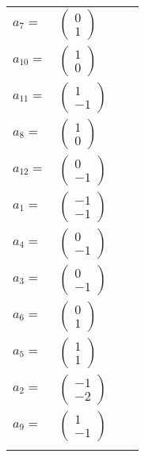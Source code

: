 \documentclass[1p]{elsarticle_modified}
\theoremstyle{definition}
\begin{document}
\begin{tabular}{m{7pt} m{180pt} m{7pt} m{180pt} }
\flushright $a_{7}=$&$\begin{pmatrix}0\\1\end{pmatrix}$ \\
\flushright $a_{10}=$&$\begin{pmatrix}1\\0\end{pmatrix}$ \\
\flushright $a_{11}=$&$\begin{pmatrix}1\\-1\end{pmatrix}$ \\
\flushright $a_{8}=$&$\begin{pmatrix}1\\0\end{pmatrix}$ \\
\flushright $a_{12}=$&$\begin{pmatrix}0\\-1\end{pmatrix}$ \\
\flushright $a_{1}=$&$\begin{pmatrix}-1\\-1\end{pmatrix}$ \\
\flushright $a_{4}=$&$\begin{pmatrix}0\\-1\end{pmatrix}$ \\
\flushright $a_{3}=$&$\begin{pmatrix}0\\-1\end{pmatrix}$ \\
\flushright $a_{6}=$&$\begin{pmatrix}0\\1\end{pmatrix}$ \\
\flushright $a_{5}=$&$\begin{pmatrix}1\\1\end{pmatrix}$ \\
\flushright $a_{2}=$&$\begin{pmatrix}-1\\-2\end{pmatrix}$ \\
\flushright $a_{9}=$&$\begin{pmatrix}1\\-1\end{pmatrix}$\\&\end{tabular}
\end{document}
